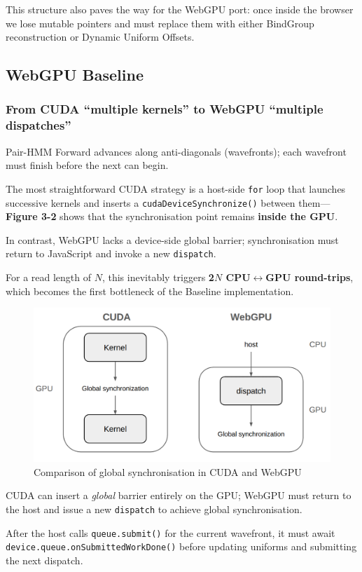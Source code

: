 \documentclass[PhD]{PHlab-thesis}
\begin{document}
This structure also paves the way for the WebGPU port: once inside the browser we lose mutable pointers and must replace them with either BindGroup reconstruction or Dynamic Uniform Offsets.

\subsection{WebGPU Baseline}
\subsubsection{From CUDA ``multiple kernels'' to WebGPU ``multiple dispatches''}
Pair-HMM Forward advances along anti-diagonals (wavefronts); each wavefront must finish before the next can begin.

The most straightforward CUDA strategy is a host-side \texttt{for} loop that launches successive kernels and inserts a \texttt{cudaDeviceSynchronize()} between them—\textbf{Figure 3-2} shows that the synchronisation point remains \textbf{inside the GPU}.

In contrast, WebGPU lacks a device-side global barrier; synchronisation must return to JavaScript and invoke a new \texttt{dispatch}.

For a read length of $N$, this inevitably triggers \textbf{2$N$ CPU$\leftrightarrow$GPU round-trips}, which becomes the first bottleneck of the Baseline implementation.

\begin{figure}[htbp]
    \centering
    \includegraphics[width=0.7\linewidth]{4. 全域同步差異圖.png}
    \caption{Comparison of global synchronisation in CUDA and WebGPU}
    \label{fig:global-sync-diff}
\end{figure}


CUDA can insert a \emph{global} barrier entirely on the GPU; WebGPU must return to the host and issue a new \texttt{dispatch} to achieve global synchronisation.

After the host calls \texttt{queue.submit()} for the current wavefront, it must await \texttt{device.queue.onSubmittedWorkDone()} before updating uniforms and submitting the next dispatch.
\end{document}
